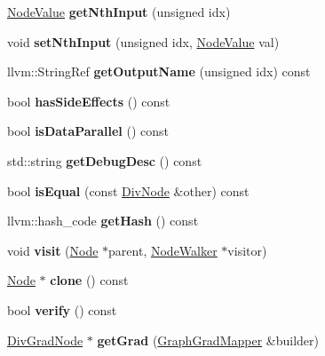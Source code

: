 \begin{DoxyCompactItemize}
\hyperlink{structglow_1_1_node_value}{Node\+Value} {\bfseries get\+Nth\+Input} (unsigned idx)
\item 
\mbox{\label{classglow_1_1_div_node_ac99bef0ed4fd27fa491140b5f5033b68}} 
void {\bfseries set\+Nth\+Input} (unsigned idx, \hyperlink{structglow_1_1_node_value}{Node\+Value} val)
\item 
\mbox{\label{classglow_1_1_div_node_acbc1fd51e6441d4405ce91090a253da5}} 
llvm\+::\+String\+Ref {\bfseries get\+Output\+Name} (unsigned idx) const
\item 
\mbox{\label{classglow_1_1_div_node_a881e0c4cd4e2bf88e969a597c241534e}} 
bool {\bfseries has\+Side\+Effects} () const
\item 
\mbox{\label{classglow_1_1_div_node_af87b22c378acc15d9a2b44c21139ce20}} 
bool {\bfseries is\+Data\+Parallel} () const
\item 
\mbox{\label{classglow_1_1_div_node_a22e2d3f59b123d11e013f6b173a9c9db}} 
std\+::string {\bfseries get\+Debug\+Desc} () const
\item 
\mbox{\label{classglow_1_1_div_node_af456b0c400ad7c6b14f6092d0e108902}} 
bool {\bfseries is\+Equal} (const \hyperlink{classglow_1_1_div_node}{Div\+Node} \&other) const
\item 
\mbox{\label{classglow_1_1_div_node_a55b9eb967bd97925e88d290a18f404f2}} 
llvm\+::hash\+\_\+code {\bfseries get\+Hash} () const
\item 
\mbox{\label{classglow_1_1_div_node_a369cc37d2fd6b0c211a308296b0f5d1b}} 
void {\bfseries visit} (\hyperlink{classglow_1_1_node}{Node} $\ast$parent, \hyperlink{classglow_1_1_node_walker}{Node\+Walker} $\ast$visitor)
\item 
\mbox{\label{classglow_1_1_div_node_a5fc5886e6b86ea38abc222d2308f5c11}} 
\hyperlink{classglow_1_1_node}{Node} $\ast$ {\bfseries clone} () const
\item 
\mbox{\label{classglow_1_1_div_node_adf5118e6290e5a86e188fcfd4f194fd2}} 
bool {\bfseries verify} () const
\item 
\mbox{\label{classglow_1_1_div_node_a08ccce8b882cbd4ec1b5ff1070ca27d6}} 
\hyperlink{classglow_1_1_div_grad_node}{Div\+Grad\+Node} $\ast$ {\bfseries get\+Grad} (\hyperlink{classglow_1_1_graph_grad_mapper}{Graph\+Grad\+Mapper} \&builder)
\end{DoxyCompactItemize}
